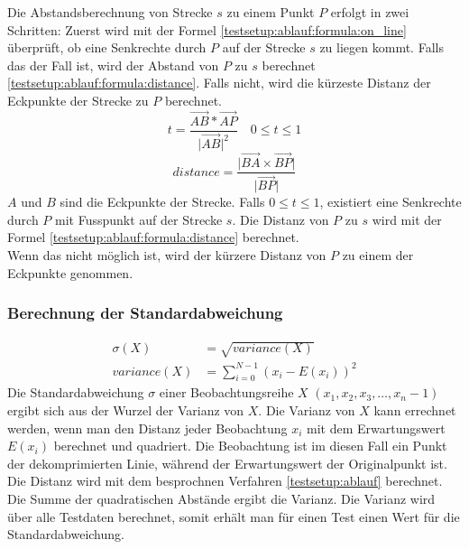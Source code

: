Die Abstandsberechnung von Strecke $s$ zu einem Punkt $P$ erfolgt in zwei Schritten: Zuerst wird mit der Formel \eqref{testsetup:ablauf:formula:on_line} überprüft, ob eine Senkrechte durch $P$ auf der Strecke $s$ zu liegen kommt. Falls das der Fall ist, wird der Abstand von $P$ zu $s$ berechnet \eqref{testsetup:ablauf:formula:distance}. Falls nicht, wird die kürzeste Distanz der Eckpunkte der Strecke zu $P$ berechnet.\\
\begin{equation} \label{testsetup:ablauf:formula:on_line}
 t = \frac{\vec{AB}*\vec{AP}}{\lvert \vec{AB}\rvert ^2} \quad 0 \leq t \leq 1
\end{equation}
\begin{equation}\label{testsetup:ablauf:formula:distance}
distance = \frac{\lvert \vec{BA}\times \vec{BP}\rvert}{\lvert \vec{BP} \rvert}
\end{equation}
$A$ und $B$ sind die Eckpunkte der Strecke. Falls $0 \leq t \leq 1$, existiert eine Senkrechte durch $P$ mit Fusspunkt auf der Strecke $s$. Die Distanz von $P$ zu $s$ wird mit der Formel \eqref{testsetup:ablauf:formula:distance} berechnet.\\
Wenn das nicht möglich ist, wird der kürzere Distanz von $P$ zu einem der Eckpunkte genommen. 

\subsubsection{Berechnung der Standardabweichung}
\begin{equation} \label{testsetup:ablauf:formula:deviation}
	\begin{split}
		\sigma(X)& = \sqrt{variance(X)}\\
		variance(X) & = \sum_{i=0}^{N-1}{(x_i - E(x_i))^2}
	\end{split}
\end{equation}
Die Standardabweichung $\sigma$ einer Beobachtungsreihe $X$ $(x_1,x_2,x_3,\ldots, x_n-1)$ ergibt sich aus der Wurzel der Varianz von $X$. Die Varianz von $X$ kann errechnet werden, wenn man den Distanz jeder Beobachtung $x_i$ mit dem Erwartungswert $E(x_i)$ berechnet und quadriert. Die Beobachtung ist im diesen Fall ein Punkt der dekomprimierten Linie, während der Erwartungswert der Originalpunkt ist. Die Distanz wird mit dem besprochnen Verfahren \ref{testsetup:ablauf} berechnet. Die Summe der quadratischen Abstände ergibt die Varianz. Die Varianz wird über alle Testdaten berechnet, somit erhält man für einen Test einen Wert für die Standardabweichung.

